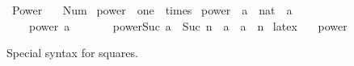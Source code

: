 %
\begin{isabellebody}%
%
%
\isadelimdocument
%
\endisadelimdocument
%
\isatagdocument
%
\isamarkuptrue%
%
\endisatagdocument
{\isafolddocument}%
%
\isadelimdocument
%
\endisadelimdocument
%
\isadelimtheory
%
\endisadelimtheory
%
\isatagtheory
{}\isamarkupfalse%
\ Power\isanewline
\ \ \ Num\isanewline
{}%
\endisatagtheory
{\isafoldtheory}%
%
\isadelimtheory
%
\endisadelimtheory
%
\isadelimdocument
%
\endisadelimdocument
%
\isatagdocument
%
\isamarkuptrue%
%
\endisatagdocument
{\isafolddocument}%
%
\isadelimdocument
%
\endisadelimdocument
{}\isamarkupfalse%
\ power\ {\isacharequal}{\kern0pt}\ one\ {\isacharplus}{\kern0pt}\ times\isanewline
{}\isanewline
\isanewline
{}\isamarkupfalse%
\ power\ {\isacharcolon}{\kern0pt}{\isacharcolon}{\kern0pt}\ {\isachardoublequoteopen}{\isacharprime}{\kern0pt}a\ {\isasymRightarrow}\ nat\ {\isasymRightarrow}\ {\isacharprime}{\kern0pt}a{\isachardoublequoteclose}\ \ {\isacharparenleft}{\kern0pt}\ {\isachardoublequoteopen}{\isacharcircum}{\kern0pt}{\isachardoublequoteclose}\ {}{}{\isacharparenright}{\kern0pt}\isanewline
\ \ \isanewline
\ \ \ \ power{\isacharunderscore}{\kern0pt}{}{\isacharcolon}{\kern0pt}\ {\isachardoublequoteopen}a\ {\isacharcircum}{\kern0pt}\ {}\ {\isacharequal}{\kern0pt}\ {}{\isachardoublequoteclose}\isanewline
\ \ {\isacharbar}{\kern0pt}\ power{\isacharunderscore}{\kern0pt}Suc{\isacharcolon}{\kern0pt}\ {\isachardoublequoteopen}a\ {\isacharcircum}{\kern0pt}\ Suc\ n\ {\isacharequal}{\kern0pt}\ a\ {\isacharasterisk}{\kern0pt}\ a\ {\isacharcircum}{\kern0pt}\ n{\isachardoublequoteclose}\isanewline
\isanewline
{}\isamarkupfalse%
\ {\isacharparenleft}{\kern0pt}latex\ \isanewline
\ \ power\ {\isacharparenleft}{\kern0pt}{\isachardoublequoteopen}{\isacharparenleft}{\kern0pt}{\isacharunderscore}{\kern0pt}\isactrlbsup {\isacharunderscore}{\kern0pt}\isactrlesup {\isacharparenright}{\kern0pt}{\isachardoublequoteclose}\ {\isacharbrackleft}{\kern0pt}{}{}{}{}{\isacharbrackright}{\kern0pt}\ {}{}{}{}{\isacharparenright}{\kern0pt}%
\begin{isamarkuptext}%
Special syntax for squares.%

\end{isamarkuptext}
\end{isabellebody}
